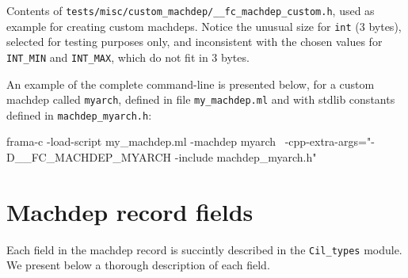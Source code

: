 \begin{example}
  Contents of \verb+tests/misc/custom_machdep/__fc_machdep_custom.h+, used as
  example for creating custom machdeps. Notice the unusual size for \verb+int+
  (3 bytes), selected for testing purposes only, and inconsistent with the
  chosen values for \verb+INT_MIN+ and \verb+INT_MAX+, which do not fit
  in 3 bytes.

\end{example}

An example of the complete command-line is presented below, for a custom
machdep called \texttt{myarch}, defined in file \verb+my_machdep.ml+ and
with stdlib constants defined in \verb+machdep_myarch.h+:

\begin{listing-nonumber}
  frama-c -load-script my_machdep.ml -machdep myarch \
    -cpp-extra-args="-D__FC_MACHDEP_MYARCH -include machdep_myarch.h"
\end{listing-nonumber}

\section{Machdep record fields}\label{sec:machdep-fields}

Each field in the machdep record is succintly described in the \verb+Cil_types+
module. We present below a thorough description of each field.

